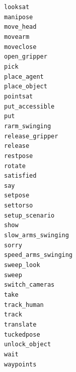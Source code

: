 \documentclass[handout,compress]{beamer}
\begin{document}
{\begin{frame}{}
\begin{multicols}{4}
{\tt looksat} \\
{\tt manipose} \\
{\tt move\_head} \\
{\tt movearm} \\
{\tt moveclose} \\
{\tt open\_gripper} \\
{\tt pick} \\
{\tt place\_agent} \\
{\tt place\_object} \\
{\tt pointsat} \\
{\tt put\_accessible} \\
{\tt put} \\
{\tt rarm\_swinging} \\
{\tt release\_gripper} \\
{\tt release} \\
{\tt restpose} \\
{\tt rotate} \\
{\tt satisfied} \\
{\tt say} \\
{\tt setpose} \\
{\tt settorso} \\
{\tt setup\_scenario} \\
{\tt show} \\
{\tt slow\_arms\_swinging} \\
{\tt sorry} \\
{\tt speed\_arms\_swinging} \\
{\tt sweep\_look} \\
{\tt sweep} \\
{\tt switch\_cameras} \\
{\tt take} \\
{\tt track\_human} \\
{\tt track} \\
{\tt translate} \\
{\tt tuckedpose} \\
{\tt unlock\_object} \\
{\tt wait} \\
{\tt waypoints} \\
    \end{multicols}
\end{frame}
}

\end{document}
